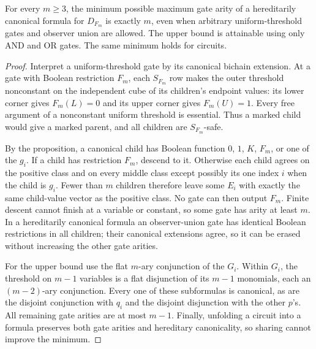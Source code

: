 \begin{corollary}
\label{core:cor:canonical-gate-arity}
For every $m\geq3$, the minimum possible maximum gate arity of a
hereditarily canonical formula for $D_{F_m}$ is exactly $m$, even when
arbitrary uniform-threshold gates and observer union are allowed.
The upper bound is attainable using only AND and OR gates. The same
minimum holds for circuits.
\end{corollary}
\begin{proof}
Interpret a uniform-threshold gate by its canonical bichain extension.
At a gate with Boolean restriction $F_m$, each $S_{F_m}$ row makes the
outer threshold nonconstant on the independent cube of its children's
endpoint values: its lower corner gives $F_m(L)=0$ and its upper corner
gives $F_m(U)=1$. Every free argument of a nonconstant uniform threshold
is essential. Thus a marked child would give a marked parent, and all
children are $S_{F_m}$-safe.

By the proposition, a canonical child has Boolean function $0$, $1$,
$K$, $F_m$, or one of the $g_i$. If a child has restriction $F_m$,
descend to it. Otherwise each child agrees on the positive class
and on every middle class except possibly its one index $i$ when the
child is $g_i$. Fewer than $m$ children therefore leave some $E_i$
with exactly the same child-value vector as the positive class. No gate
can then output $F_m$. Finite descent cannot finish at a variable or
constant, so some gate has arity at least $m$.
In a hereditarily canonical formula an observer-union gate has identical
Boolean restrictions in all children; their canonical extensions agree,
so it can be erased without increasing the other gate arities.

For the upper bound use the flat $m$-ary conjunction of the $G_i$.
Within $G_i$, the threshold on $m-1$ variables is a flat disjunction of
its $m-1$ monomials, each an $(m-2)$-ary conjunction. Every one of these
subformulas is canonical, as are the disjoint conjunction with $q_i$
and the disjoint disjunction with the other $p$'s. All remaining gate
arities are at most $m-1$. Finally, unfolding a circuit into a formula
preserves both gate arities and hereditary canonicality, so sharing
cannot improve the minimum.
\end{proof}
